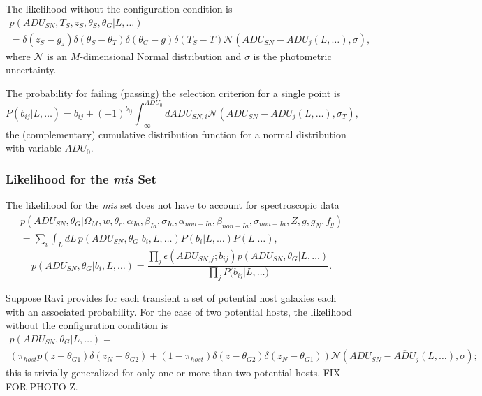 \documentclass[preprint,3p]{elsarticle}
\begin{document}
The likelihood without the configuration condition is
\begin{multline}
p(\mathit{ADU}_{SN}, {{T}}_S,{{z}}_S, \theta_{S}, \theta_G | L, \ldots) \\
= \delta(z_S - g_z) \delta(\theta_S-\theta_T) \delta(\theta_G -g) \delta(T_S-T)  \mathcal{N}
\left(\mathit{ADU}_{SN} -\overline{\mathit{ADU}}_j(L ,\ldots), \sigma \right),
\end{multline}
where $\mathcal{N}$ is an $M$-dimensional Normal distribution
and $\sigma$ is the photometric uncertainty.  

The probability for failing (passing) the selection criterion for a single point is
\begin{equation}
P(b_{ij} | L, \ldots) = b_{ij} + (-1)^{b_{ij}}\int_{-\infty}^{ADU_0} d\mathit{ADU}_{SN,i}  \mathcal{N}\left(\mathit{ADU}_{SN} - \overline{\mathit{ADU}}_j(L ,\ldots), \sigma_T \right),
\end{equation}
the (complementary) cumulative distribution function for a normal distribution
with variable
$\mathit{ADU}_0$.

\subsubsection{Likelihood for the {\it mis} Set}
The likelihood for the {\it mis} set does not have to account for spectroscopic data
\begin{multline}
p(\mathit{ADU}_{SN}, \theta_G |  \Omega_M, w, \theta_r, \alpha_{Ia}, \beta_{Ia},\sigma_{Ia}, \alpha_{\mathit{non-Ia}},\beta_{\mathit{non-Ia}}, \sigma_{\mathit{non-Ia}},  Z, g, g_N, f_g)\\
= \sum_i \int_L dL\, p(\mathit{ADU}_{SN}, \theta_G | b_i, L, \ldots)
P(b_{i} |L, \ldots) P(L|\ldots) ,
\end{multline} 
\begin{equation}
p(\mathit{ADU}_{SN}, \theta_G | b_i, L, \ldots)
  =  \frac{ \prod_j
 \epsilon(\mathit{ADU}_{SN,j}; b_{ij})
  p(\mathit{ADU}_{SN}, \theta_G | L, \ldots)}
  {\prod_j P(b_{ij}{ |L,\dots)}}.
\label{misconf:eqn}
\end{equation}

Suppose Ravi provides for each transient a set of potential host galaxies
each with an associated probability.  For the case of two potential hosts,
the likelihood without the configuration condition is
\begin{multline}
p(\mathit{ADU}_{SN}, \theta_{G}| L, \ldots) = \\
 \left(\pi_{host} p(z-\theta_{G1})\delta(z_N-\theta_{G2}) +
	(1-\pi_{host}) \delta(z-\theta_{G2})\delta(z_N-\theta_{G1})
\right) \mathcal{N}
\left(\mathit{ADU}_{SN} -\overline{\mathit{ADU}}_j(L ,\ldots), \sigma \right);
\end{multline}
this is trivially generalized for only one or more than two potential hosts.
FIX FOR PHOTO-Z.
\end{document}
